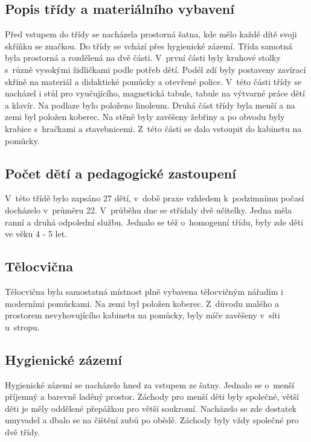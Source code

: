 
		\subsection{Popis třídy a materiálního vybavení}

			Před vstupem do třídy se nacházela prostorná šatna, kde mělo každé dítě svoji skříňku se značkou. Do třídy se vchází přes hygienické zázemí. Třída samotná byla prostorná a rozdělená na dvě části. V~první části byly kruhové stolky s~různě vysokými židličkami podle potřeb dětí. Podél zdí byly postaveny zavírací skříně na materiál a didaktické pomůcky a otevřené police. V~této části třídy se nacházel i stůl pro vyučujícího, magnetická tabule, tabule na výtvarné práce dětí a klavír. Na podlaze bylo položeno linoleum. Druhá část třídy byla menší a na zemi byl položen koberec. Na stěně byly zavěšeny žebřiny a po obvodu byly krabice s~hračkami a stavebnicemi. Z~této části se dalo vstoupit do kabinetu na pomůcky.

		\subsection{Počet dětí a pedagogické zastoupení}

			V~této třídě bylo zapsáno 27 dětí, v~době praxe vzhledem k~podzimnímu počasí docházelo v~průměru 22. V~průběhu dne se střídaly dvě učitelky. Jedna měla ranní a druhá odpolední službu.
			Jednalo se též o~homogenní třídu, byly zde děti ve věku 4 - 5 let.
		
		\subsection{Tělocvična}
			Tělocvična byla samostatná místnost plně vybavena tělocvičným nářadím i moderními pomůckami. Na zemi byl položen koberec. Z~důvodu malého a prostorem nevyhovujícího kabinetu na pomůcky,  byly míče zavěšeny v~síti u~stropu.

		\subsection{Hygienické zázemí}
			Hygienické zázemí se nacházelo hned za vstupem ze šatny. Jednalo se o~menší příjemný a barevně laděný prostor. Záchody pro menší děti byly společné, větší děti je měly oddělené přepážkou pro větší soukromí. Nacházelo se zde dostatek umyvadel a dbalo se na čištění zubů po obědě. Záchody byly vždy společné pro dvě třídy. 

